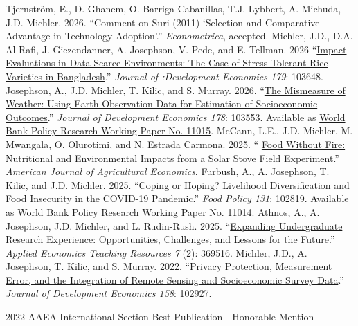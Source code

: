 \documentclass[letterpaper]{article}
\renewenvironment{itemize}{
  \begin{list}
  	{}{
    \setlength{\leftmargin}{1.5em}
    \setlength{\itemsep}{-.5em}
  }
}{
  \end{list}
}
\begin{document}
\begin{itemize}
\leftskip 0.25in
\parindent -0.5in
\subitem[26] Tjernstr\"{o}m, E., D. Ghanem, O. Barriga Cabanillas, T.J. Lybbert, A. Michuda, J.D. Michler. 2026. ``Comment on Suri (2011) `Selection and Comparative Advantage in Technology Adoption'.'' \emph{Econometrica}, accepted.
\subitem[25] Michler, J.D., D.A. Al Rafi, J. Giezendanner, A. Josephson, V. Pede, and E. Tellman. 2026 ``\href{https://doi.org/10.1016/j.jdeveco.2025.103648}{Impact Evaluations in Data-Scarce Environments: The Case of Stress-Tolerant Rice Varieties in Bangladesh}.'' \emph{Journal of :Development Economics 179}: 103648.
\subitem[24] Josephson, A., J.D. Michler, T. Kilic, and S. Murray. 2026. ``\href{https://doi.org/10.1016/j.jdeveco.2025.103553}{The Mismeasure of Weather: Using Earth Observation Data for Estimation of Socioeconomic Outcomes}.'' \emph{Journal of Development Economics 178}:  103553. Available as \href{http://documents.worldbank.org/curated/en/099850401072516334/IDU16cb26542195d814cc21b3191ae81d19d57ec}{World Bank Policy Research Working Paper No. 11015}.
\subitem[23] McCann, L.E., J.D. Michler, M. Mwangala, O. Olurotimi, and N. Estrada Carmona. 2025. `` \href{https://doi.org/10.1111/ajae.70026}{Food Without Fire: Nutritional and Environmental Impacts from a Solar Stove Field Experiment}.'' \emph{American Journal of Agricultural Economics}.
\subitem[22] Furbush, A., A. Josephson, T. Kilic, and J.D. Michler. 2025. ``\href{https://doi.org/10.1016/j.foodpol.2025.102819}{Coping or Hoping? Livelihood Diversification and Food Insecurity in the COVID-19 Pandemic}.'' \emph{Food Policy 131}: 102819. Available as \href{http://documents.worldbank.org/curated/en/099830101072519538/IDU1b45f8bf4104061493a18b9e12cfbee039761}{World Bank Policy Research Working Paper No. 11014}.
\subitem[21] Athnos, A., A. Josephson, J.D. Michler, and L. Rudin-Rush. 2025. ``\href{https://doi.org/10.71162/aetr.369516}{Expanding Undergraduate Research Experience: Opportunities, Challenges, and Lessons for the Future}.'' \emph{Applied Economics Teaching Resources 7} (2): 369516.
\subitem[20] Michler, J.D., A. Josephson, T. Kilic, and S. Murray. 2022. ``\href{https://doi.org/10.1016/j.jdeveco.2022.102927}{Privacy Protection, Measurement Error, and the Integration of Remote Sensing and Socioeconomic Survey Data}.'' \emph{Journal of Development Economics 158}: 102927.
\begin{itemize}
        \leftskip 0.25in
	\parindent -0.5in
	\item[\textbullet] 2022 AAEA International Section Best Publication - Honorable Mention
\end{itemize}

\end{itemize}
\end{document}
